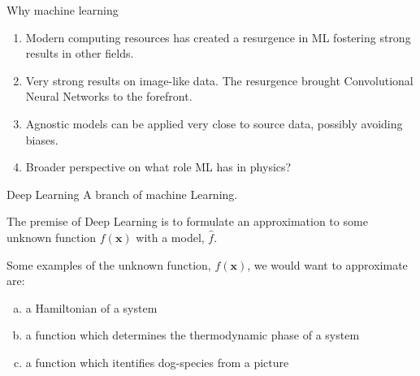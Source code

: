 \documentclass{beamer}
\begin{document}
\begin{frame}[t]{Why machine learning}
	\begin{enumerate}[I]
		\item Modern computing resources has created a resurgence in ML fostering strong results in other fields.
		\item Very strong results on image-like data. The resurgence brought Convolutional Neural Networks to the forefront.
		\item Agnostic models can be applied very close to source data, possibly avoiding biases.
		\item Broader perspective on what role ML has in physics?
	\end{enumerate}
\end{frame}

\begin{frame}[t]{Deep Learning}
	A branch of machine Learning.

	The premise of Deep Learning is to formulate an approximation to some unknown function $f(\mathbf{x})$ with a model, $\hat{f}$. 

	Some examples of the unknown function, $f(\mathbf{x})$, we would want to approximate are:
	\begin{enumerate}[(a)]
		\item a Hamiltonian of a system 
		\item a function which determines the thermodynamic phase of a system
		\item a function which itentifies dog-species from a picture
	\end{enumerate}
\end{frame}

%
%
%
%
\end{document}
